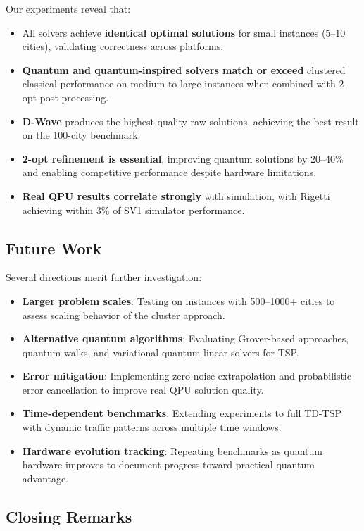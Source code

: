 \documentclass[conference]{IEEEtran}
\begin{document}
Our experiments reveal that:
\begin{itemize}
\item All solvers achieve \textbf{identical optimal solutions} for small instances (5--10 cities), validating correctness across platforms.
\item \textbf{Quantum and quantum-inspired solvers match or exceed} clustered classical performance on medium-to-large instances when combined with 2-opt post-processing.
\item \textbf{D-Wave} produces the highest-quality raw solutions, achieving the best result on the 100-city benchmark.
\item \textbf{2-opt refinement is essential}, improving quantum solutions by 20--40\% and enabling competitive performance despite hardware limitations.
\item \textbf{Real QPU results correlate strongly} with simulation, with Rigetti achieving within 3\% of SV1 simulator performance.
\end{itemize}

\subsection{Future Work}

Several directions merit further investigation:
\begin{itemize}
\item \textbf{Larger problem scales}: Testing on instances with 500--1000+ cities to assess scaling behavior of the cluster approach.
\item \textbf{Alternative quantum algorithms}: Evaluating Grover-based approaches, quantum walks, and variational quantum linear solvers for TSP.
\item \textbf{Error mitigation}: Implementing zero-noise extrapolation and probabilistic error cancellation to improve real QPU solution quality.
\item \textbf{Time-dependent benchmarks}: Extending experiments to full TD-TSP with dynamic traffic patterns across multiple time windows.
\item \textbf{Hardware evolution tracking}: Repeating benchmarks as quantum hardware improves to document progress toward practical quantum advantage.
\end{itemize}

\subsection{Closing Remarks}
\end{document}
